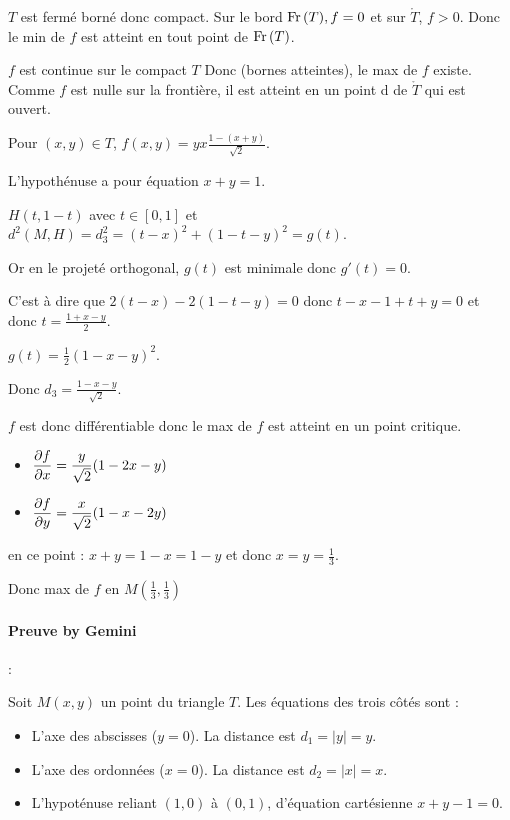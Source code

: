 \begin{exemple}
    $T$ est fermé borné donc compact. Sur le bord $\operatorname{Fr} \,(T), f= 0$ et sur $\mathring T$, $f > 0$. 
    Donc le min de $f$ est atteint en tout point de $\operatorname{Fr} \,(T)$. 

    $f$ est continue sur le compact $T$ Donc (bornes atteintes), le max de $f$ 
    existe. Comme $f$ est nulle sur la frontière, il est atteint en un point 
    d de $\mathring T$ qui est ouvert. 

    Pour $(x, y) \in T$, $f(x, y) = y x \frac{1 - (x + y)}{\sqrt 2}$. 

    L'hypothénuse a pour équation $x + y = 1$.

    $H(t, 1 - t)$ avec $t \in [0, 1]$ et $d^2(M, H) = d_3^2 = (t - x)^2 + (1 - t - y)^2 = g(t)$.
    
    Or en le projeté orthogonal, $g(t)$ est minimale donc $g'(t) = 0$.

    C'est à dire que $2 (t - x) - 2(1 - t - y) = 0$ donc 
    $t - x - 1 + t+ y = 0$ et donc $t = \frac{1 + x - y}{2}$.

    $g(t) = \frac 1 2 (1 - x - y)^2$. 

    Donc $d_3 = \frac{ 1 - x - y}{\sqrt 2 }$. 

    $f$ est donc différentiable donc le max de $f$ est atteint en un point critique. 

    \begin{itemize}
        \item $\displaystyle \frac{\partial f}{\partial x} = \frac{y}{\sqrt 2} (1 - 2x - y)$
        \item $\displaystyle \frac{\partial f}{\partial y} = \frac{x}{\sqrt 2} (1 - x - 2y)$
    \end{itemize}

    en ce point : $x + y = 1 -x = 1 - y$ et donc $x = y = \frac 1 3$.

    Donc max de $f$ en $M\left( \frac 1 3, \frac 1 3 \right)$

    \lvspace \paragraph*{Preuve by Gemini} :


    \svspace Soit $M(x,y)$ un point du triangle $T$. Les équations des trois côtés sont :
    \begin{itemize}
        \item L'axe des abscisses ($y=0$). La distance est $d_1 = |y| = y$.
        \item L'axe des ordonnées ($x=0$). La distance est $d_2 = |x| = x$.
        \item L'hypoténuse reliant $(1,0)$ à $(0,1)$, d'équation cartésienne $x+y-1=0$.
    \end{itemize}


\end{exemple}
